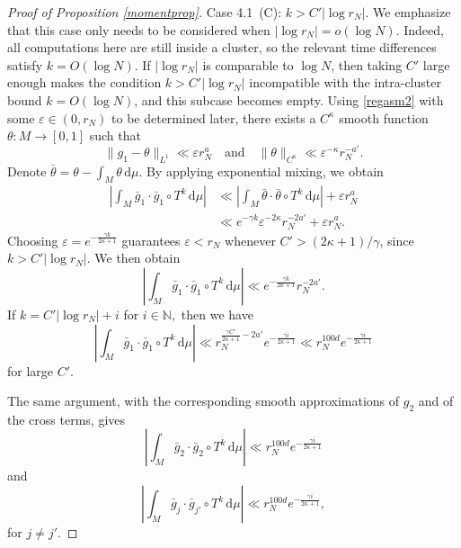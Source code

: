 \documentclass[10pt,a4paper]{amsart}
\renewcommand{\d}{\, \text{d}}
\begin{document}
\begin{proof}[Proof of Proposition \ref{momentprop}]
Case 4.1~(C): $k> C' \left|\log r_N\right|.$ We emphasize that this case only needs to be considered when $|\log r_N|=o(\log N)$. Indeed, all computations here are still inside a cluster, so the relevant time differences satisfy $k=O(\log N)$. If $|\log r_N|$ is comparable to $\log N$, then taking $C'$ large enough makes the condition $k>C'|\log r_N|$ incompatible with the intra-cluster bound $k=O(\log N)$, and this subcase becomes empty. Using \eqref{regasm2} with some $\varepsilon\in (0,r_N)$ to be determined later, there exists a $C^{\kappa}$ smooth function $\theta:M\rightarrow[0,1]$ such that
\begin{equation*}
\|g_1-\theta\|_{L^1} \ll\varepsilon r_N^a \quad \text{and} \quad \|\theta\|_{C^{\kappa}} \ll\varepsilon^{-\kappa} r_N^{-a'}.
\end{equation*}
Denote $\bar{\theta}=\theta - \int_M \theta\d\mu$. By applying exponential mixing, we obtain
\begin{align*}
\left| \int_M \bar{g}_{1} \cdot \bar{g}_{1} \circ T^{k} \d\mu \right| &\ll \left| \int_M \bar{\theta} \cdot \bar{\theta} \circ T^{k} \d\mu \right| + \varepsilon r_N^{a} \\
& \ll e^{-\gamma k} \varepsilon^{-2\kappa} r_N^{-2a'} +\varepsilon r_N^a.
\end{align*}
Choosing $\varepsilon=e^{-\frac{\gamma k}{2\kappa+1}}$ guarantees $\varepsilon<r_N$ whenever $C'>(2\kappa+1)/\gamma$, since $k>C'\left|\log r_N\right|$. We then obtain
\begin{equation*}
\left| \int_M \bar{g}_{1} \cdot \bar{g}_{1} \circ T^{k} \d\mu \right| \ll e^{-\frac{\gamma k}{2\kappa+1}} r_N^{-2a'}.
\end{equation*}
If $k=C'|\log r_N| + i$ for $i\in\mathbb{N},$ then we have
\begin{equation*}
\left| \int_M \bar{g}_{1} \cdot \bar{g}_{1} \circ T^{k} \d\mu \right| \ll r_N^{\frac{\gamma C'}{2\kappa+1}-2a'}e^{-\frac{\gamma i}{2\kappa+1}}\ll r_N^{100d} e^{-\frac{\gamma i}{2\kappa+1}}
\end{equation*}
for large $C'$.


The same argument, with the corresponding smooth approximations of $g_2$ and of the cross terms, gives
\begin{equation*}
\left| \int_M \bar{g}_{2} \cdot \bar{g}_{2} \circ T^{k} \d\mu \right| \ll r_N^{100d} e^{-\frac{\gamma i}{2\kappa+1}}
\end{equation*}
and
\begin{equation*}
\left| \int_M \bar{g}_{j} \cdot \bar{g}_{j'} \circ T^{k} \d\mu \right| \ll r_N^{100d} e^{-\frac{\gamma i}{2\kappa+1}},
\end{equation*}
for $j\neq j'$.








\end{proof}
\end{document}

